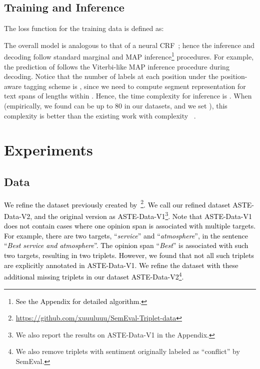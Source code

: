 \documentclass[11pt,a4paper]{article}
\begin{document}
\subsection{Training and Inference}
The loss function  for the training data  is defined as:
\setlength{\abovedisplayskip}{-2pt} \setlength{\abovedisplayshortskip}{-2pt}
\setlength{\belowdisplayskip}{3pt} \setlength{\belowdisplayshortskip}{3pt}

The overall model is analogous to that of a neural CRF~\cite{NIPS2009_3869,do2010neural,lample2016neural}; hence the inference and decoding follow standard marginal and MAP inference\footnote{\textcolor{black}{See the Appendix for detailed algorithm.}} procedures.
For example, the prediction of  follows the Viterbi-like MAP inference procedure during decoding.
Notice that the number of labels at each position under the  position-aware tagging scheme is , since we need to compute segment representation for text spans of lengths within .
Hence, the time complexity for inference is .
{\color{black}When  (empirically, we found  can be up to 80 in our datasets, and we set ), this complexity is better than the existing work with complexity ~\cite{peng2019knowing}.}







\section{Experiments}




\subsection{Data}
\textcolor{black}{ 
We refine the dataset previously created by~\citet{peng2019knowing}\footnote{ \url{https://github.com/xuuuluuu/SemEval-Triplet-data}}.
We call our refined dataset  ASTE-Data-V2, and the original version as ASTE-Data-V1\footnote{We also report the results on ASTE-Data-V1 in the Appendix.}.
Note that ASTE-Data-V1 does not contain  cases where one opinion span is associated with multiple targets.
For example, there are two targets, ``\textit{service}'' and ``\textit{atmosphere}'', in the sentence ``\textit{Best service and atmosphere}''. The opinion span ``\textit{Best}'' is associated with such two targets, resulting in two triplets.
However, we found that not all such triplets are explicitly annotated in ASTE-Data-V1.
We refine the dataset with these additional missing triplets in our dataset ASTE-Data-V2\footnote{We also remove triplets with sentiment originally labeled as ``conflict'' by SemEval.}.
}
\end{document}
